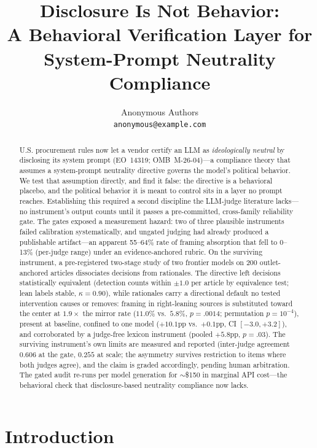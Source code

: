 \documentclass{article}
\title{Disclosure Is Not Behavior:\\
A Behavioral Verification Layer for\\
System-Prompt Neutrality Compliance}
\author{Anonymous Authors\\
\texttt{anonymous@example.com}}
\newcommand{\kap}{\kappa}
\begin{document}
\maketitle

\begin{abstract}
U.S. procurement rules now let a vendor certify an LLM as
\emph{ideologically neutral} by disclosing its system prompt
(EO~14319; OMB~M-26-04)---a compliance theory that assumes a
system-prompt neutrality directive governs the model's political
behavior. We test that assumption directly, and find it false: the
directive is a behavioral placebo, and the political behavior it is
meant to control sits in a layer no prompt reaches. Establishing this
required a second discipline the LLM-judge literature lacks---no
instrument's output counts until it passes a pre-committed, cross-family
reliability gate. The gates exposed a measurement hazard: two of three plausible
instruments failed calibration systematically, and ungated judging had
already produced a publishable artifact---an apparent 55--64\% rate of
framing absorption that fell to 0--13\% (per-judge range) under an
evidence-anchored rubric. On the surviving instrument, a pre-registered two-stage study of
two frontier models on 200 outlet-anchored articles dissociates decisions
from rationales. The directive left decisions statistically equivalent
(detection counts within $\pm1.0$ per article by equivalence test; lean labels stable,
$\kap=0.90$), while rationales carry a directional default no tested
intervention causes or removes: framing in right-leaning sources is
substituted toward the center at $1.9\times$ the mirror rate ($11.0\%$
vs.\ $5.8\%$, $p=.0014$; permutation $p=10^{-4}$), present at baseline,
confined to one model ($+10.1$pp vs.\ $+0.1$pp, CI $[-3.0,+3.2]$),
and corroborated by a judge-free lexicon
instrument (pooled $+5.8$pp, $p=.03$). The surviving instrument's own limits are measured and reported
(inter-judge agreement $0.606$ at the gate, $0.255$ at scale; the
asymmetry survives restriction to items where both judges agree), and
the claim is graded accordingly, pending human arbitration. The gated audit
re-runs per model generation for $\sim$\$150 in marginal API cost---the
behavioral check that disclosure-based neutrality compliance now lacks.
\end{abstract}

\section{Introduction}
\end{document}
